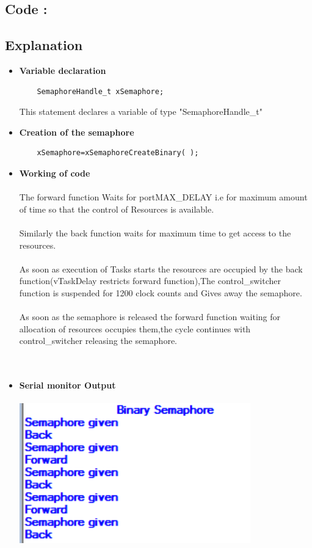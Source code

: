 \documentclass[11pt,a4paper]{article}
\begin{document}
\subsection{Code : }
		
	\newpage
\subsection{Explanation}
	\begin{itemize}
	\item \textbf{Variable declaration}	
	
	\begin{lstlisting}
	SemaphoreHandle_t xSemaphore;
	\end{lstlisting}
	
	 This statement declares a variable of type "SemaphoreHandle\_t"
	
	\item \textbf{Creation of the semaphore}
	
	\begin{lstlisting}
	xSemaphore=xSemaphoreCreateBinary( );
	\end{lstlisting}

\item \textbf{Working of code}
	  \\
	  \\
	  The forward function Waits for portMAX\_DELAY i.e for maximum amount of time so that the control of Resources is available.
	  \\
	  \\
	  Similarly the back function waits for maximum time to get access to the resources.
	  \\
	  \\	
	  As soon as execution of Tasks starts the resources are occupied by the back function(vTaskDelay restricts forward function),The control\_switcher function is suspended for 1200 clock counts and Gives away the semaphore.
	  \\
	  \\
	  As soon as the semaphore is released the forward function waiting for allocation of resources occupies them,the cycle continues with control\_switcher releasing the semaphore.  
		\\
		\\
		\\
\item \textbf{Serial monitor Output} 
\\
\\
\includegraphics[width=10cm]{bin}

\end{itemize}
\newpage 
\end{document}
